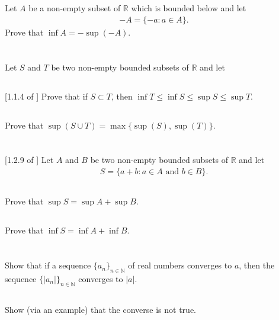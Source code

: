 \documentclass[11pt,letterpaper]{article}
\begin{document}
\section{}
Let $A$ be a non-empty subset of $\mathbb{R}$ which is bounded below and let
\begin{align}
    -A = \{-a:a\in A\}.
\end{align}
Prove that $\inf A = -\sup(-A)$.

\section{}
Let $S$ and $T$ be two non-empty bounded subsets of $\mathbb{R}$ and let

\subsection{} [1.1.4 of \cite{Lebl_23}] Prove that if $S \subset T$, then $\inf T \leq \inf S \leq \sup S \leq \sup T$.

\subsection{} Prove that $\sup(S\cup T) = \max\{\sup(S),\sup(T)\}$. 

\section{}
[1.2.9 of \cite{Lebl_23}] Let $A$ and $B$ be two non-empty bounded subsets of $\mathbb{R}$ and let
\begin{align}
    S = \{a+b:a\in A \text{ and } b\in B\}.
\end{align}
\subsection{} Prove that $\sup S = \sup A+\sup B$.
\subsection{} Prove that $\inf S = \inf A+\inf B$.

\section{}
\subsection{} Show that if a sequence $\{a_n\}_{n\in\mathbb{N}}$ of real numbers converges to $a$, then the sequence $\{|a_n|\}_{n\in\mathbb{N}}$ converges to $|a|$. 
\subsection{} Show (via an example) that the converse is not true.


\vfill
\printbibliography
\end{document}
